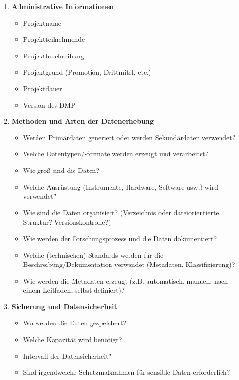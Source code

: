 \begin{enumerate}[start=0, label=\textbf{\arabic*})]
  \item \textbf{Administrative Informationen}
        \begin{itemize}
          \item Projektname
          \item Projektteilnehmende
          \item Projektbeschreibung
          \item Projektgrund (Promotion, Drittmitel, etc.)
          \item Projektdauer
          \item Version des DMP
        \end{itemize}
  \item \textbf{Methoden und Arten der Datenerhebung}
        \begin{itemize}
          \item Werden Primärdaten generiert oder werden Sekundärdaten verwendet?
        \item Welche Datentypen/-formate werden erzeugt und verarbeitet?
        \item Wie groß sind die Daten?
        \item Welche Ausrüstung (Instrumente, Hardware, Software usw.) wird
              verwendet?
        \item Wie sind die Daten organisiert? (Verzeichnis oder dateiorientierte
              Struktur? Versionskontrolle?)
        \item Wie werden der Forschungsprozess und die Daten dokumentiert?
        \item Welche (technischen) Standards werden für die
              Beschreibung/Dokumentation verwendet (Metadaten, Klassifizierung)?
        \item Wie werden die Metadaten erzeugt (z.B. automatisch, manuell, nach
              einem Leitfaden, selbst definiert)?
        \end{itemize}
  \item \textbf{Sicherung und Datensicherheit}
        \begin{itemize}
          \item Wo werden die Daten gespeichert?
          \item Welche Kapazität wird benötigt?
          \item Intervall der Datensicherheit?
          \item Sind irgendwelche Schutzmaßnahmen für sensible Daten erforderlich?

\end{itemize}
\end{enumerate}
